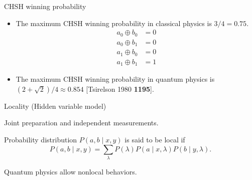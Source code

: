 \documentclass{beamer}
\newcommand\emm[1]{\textcolor{redorange}{{#1}}}
\newcommand\numc[1]{\textcolor{citation}{{\bf #1}}}
\begin{document}
\begin{frame}{CHSH winning probability}
\begin{itemize}
\setlength{\itemsep}{3.5em}
\item The maximum CHSH winning probability in \emm{classical physics} is $3/4=0.75$.\\
\begin{align*}
a_0\oplus b_0 &=0\\
a_0\oplus b_1 &=0\\
a_1\oplus b_0 &=0\\
a_1\oplus b_1 &=1
\end{align*}
\item The maximum CHSH winning probability in \emm{quantum physics} is $(2+\sqrt{2})/4\approx 0.854$
[Tsirelson 1980 \numc{1195}].
\end{itemize}
\end{frame}

\begin{frame}{Locality (Hidden variable model)}
\begin{center}
Joint preparation and independent measurements.
\end{center}
Probability distribution $P(a,b\mid x,y)$ is said to be \emm{local} if
\begin{equation*}
P(a, b\mid x,y) = \sum_{\lambda} P(\lambda) P(a\mid x, \lambda) P(b\mid y,\lambda).
\end{equation*}
\vspace{2em}
\begin{center}
Quantum physics allow \emm{nonlocal} behaviors.
\end{center}
\end{frame}
\end{document}
